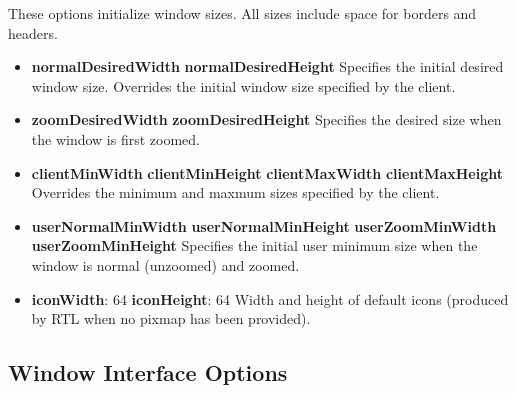 These options initialize window sizes.  All sizes include
space for borders and headers.

\begin{itemize}
\item {\bf normalDesiredWidth}\newline{}
{\bf normalDesiredHeight}\newline{}
Specifies the initial desired window size.  Overrides
the initial window size specified by the client.

\item {\bf zoomDesiredWidth}\newline{}
{\bf zoomDesiredHeight}\newline{}
Specifies the desired size when the window is
first zoomed.

\item {\bf clientMinWidth}\newline{}
{\bf clientMinHeight}\newline{}
{\bf clientMaxWidth}\newline{}
{\bf clientMaxHeight}\newline{}
Overrides the minimum and maxmum sizes specified by the client.

\item {\bf userNormalMinWidth}\newline{}
{\bf userNormalMinHeight}\newline{}
{\bf userZoomMinWidth}\newline{}
{\bf userZoomMinHeight}\newline{}
Specifies the initial user minimum size when the window is
normal (unzoomed) and zoomed.

\item {\bf iconWidth}: 64\newline{}
{\bf iconHeight}: 64\newline{}
Width and height of default icons (produced by RTL
when no pixmap has been provided).
\end{itemize}

\subsection{Window Interface Options}

